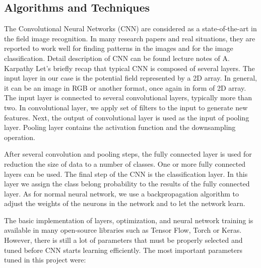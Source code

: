 \documentclass{article}
\begin{document}
\subsection{Algorithms and
Techniques}\label{algorithms-and-techniques}

The Convolutional Neural Networks (CNN) are considered as a
state-of-the-art in the field image recognition. In many research papers
and real situations, they are reported to work well for finding patterns
in the images and for the image classification. Detail description of
CNN can be found lecture notes of A. Karpathy \cite{stanford}
Let's briefly recap that typical CNN is composed of several layers. The
input layer in our case is the potential field represented by a 2D
array. In general, it can be an image in RGB or another format, once
again in form of 2D array. The input layer is connected to several
convolutional layers, typically more than two. In convolutional layer,
we apply set of filters to the input to generate new features. Next, the
output of convolutional layer is used as the input of pooling layer.
Pooling layer contains the activation function and the downsampling
operation.

After several convolution and pooling steps, the fully connected layer
is used for reduction the size of data to a number of classes. One or
more fully connected layers can be used. The final step of the CNN is
the classification layer. In this layer we assign the class belong
probability to the results of the fully connected layer. As for normal
neural network, we use a backpropagation algorithm to adjust the weights
of the neurons in the network and to let the network learn.

The basic implementation of layers, optimization, and neural network
training is available in many open-source libraries such as Tensor Flow,
Torch or Keras. However, there is still a lot of parameters that must be
properly selected and tuned before CNN starts learning efficiently. The
most important parameters tuned in this project were:
\end{document}
